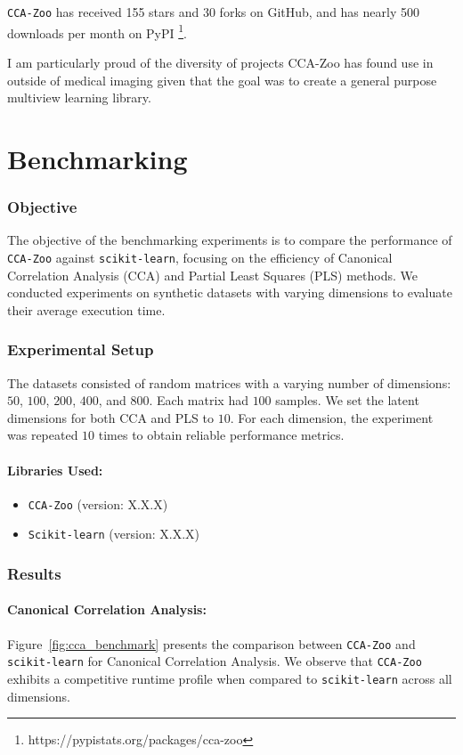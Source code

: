\texttt{CCA-Zoo} has received 155 stars and 30 forks on GitHub, and has nearly 500 downloads per month on PyPI \footnote{https://pypistats.org/packages/cca-zoo}.

I am particularly proud of the diversity of projects CCA-Zoo has found use in outside of medical imaging given that the goal was to create a general purpose multiview learning library.

\section{Benchmarking}

\subsubsection{Objective}
The objective of the benchmarking experiments is to compare the performance of \texttt{CCA-Zoo} against \texttt{scikit-learn}, focusing on the efficiency of Canonical Correlation Analysis (CCA) and Partial Least Squares (PLS) methods.
We conducted experiments on synthetic datasets with varying dimensions to evaluate their average execution time.

\subsubsection{Experimental Setup}
The datasets consisted of random matrices with a varying number of dimensions: \(50\), \(100\), \(200\), \(400\), and \(800\). Each matrix had \(100\) samples. We set the latent dimensions for both CCA and PLS to \(10\). For each dimension, the experiment was repeated \(10\) times to obtain reliable performance metrics.

\paragraph{Libraries Used:}
\begin{itemize}
    \item \texttt{CCA-Zoo} (version: X.X.X)
    \item \texttt{Scikit-learn} (version: X.X.X)
\end{itemize}

\subsubsection{Results}

\paragraph{Canonical Correlation Analysis:}
Figure~\ref{fig:cca_benchmark} presents the comparison between \texttt{CCA-Zoo} and \texttt{scikit-learn} for Canonical Correlation Analysis. We observe that \texttt{CCA-Zoo} exhibits a competitive runtime profile when compared to \texttt{scikit-learn} across all dimensions.

